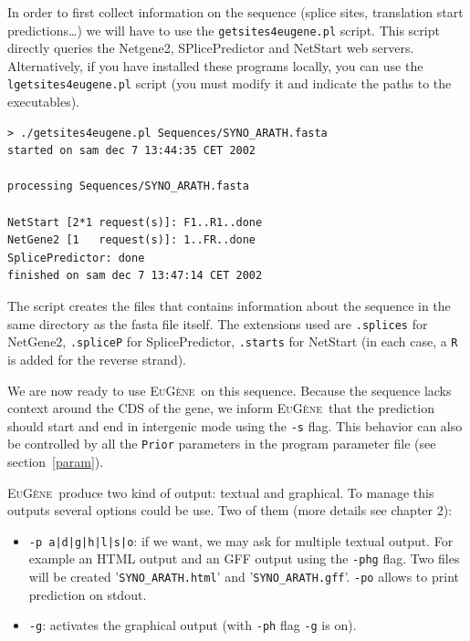 \documentclass[a4paper,titlepage]{report}
\newcommand{\EuGene}{\textsc{EuG\`ene}}
\begin{document}
In order to first collect information on the sequence (splice sites,
translation start predictions\ldots) we will have to use the
\texttt{getsites4eugene.pl} script. This script directly queries the
Netgene2, SPlicePredictor and NetStart web servers. Alternatively, if
you have installed these programs locally, you can use the
\texttt{lgetsites4eugene.pl} script (you must modify it and indicate
the paths to the executables). 

\begin{Verbatim}[fontsize=\scriptsize]
> ./getsites4eugene.pl Sequences/SYNO_ARATH.fasta 
started on sam dec 7 13:44:35 CET 2002

processing Sequences/SYNO_ARATH.fasta

NetStart [2*1 request(s)]: F1..R1..done
NetGene2 [1   request(s)]: 1..FR..done
SplicePredictor: done
finished on sam dec 7 13:47:14 CET 2002
\end{Verbatim}

The script creates the files that contains information about the
sequence in the same directory as the fasta file itself. The
extensions used are \texttt{.splices} for NetGene2, \texttt{.spliceP}
for SplicePredictor, \texttt{.starts} for NetStart (in each case, a
\texttt{R} is added for the reverse strand). 

We are now ready to use \EuGene\ on this sequence. Because the
sequence lacks context around the CDS of the gene, we inform \EuGene\ 
that the prediction should start and end in intergenic mode using the
\texttt{-s} flag. This behavior can also be controlled by all the
\texttt{Prior} parameters in the program parameter file (see
section~\ref{param}).

\EuGene\ produce two kind of output: textual and graphical. To manage this outputs
several options could be use. Two of them (more details see chapter 2):
\begin{itemize}
\item \texttt{-p a|d|g|h|l|s|o}: if we want, we may ask for multiple textual output. For example an HTML output
and an GFF output using the \texttt{-phg} flag. Two files will be created '\texttt{SYNO\_ARATH.html}'
and '\texttt{SYNO\_ARATH.gff}'. \texttt{-po} allows to print prediction on stdout.
\item \texttt{-g}: activates the graphical output (with \texttt{-ph} flag \texttt{-g} is on).\\
\end{itemize}
\end{document}
